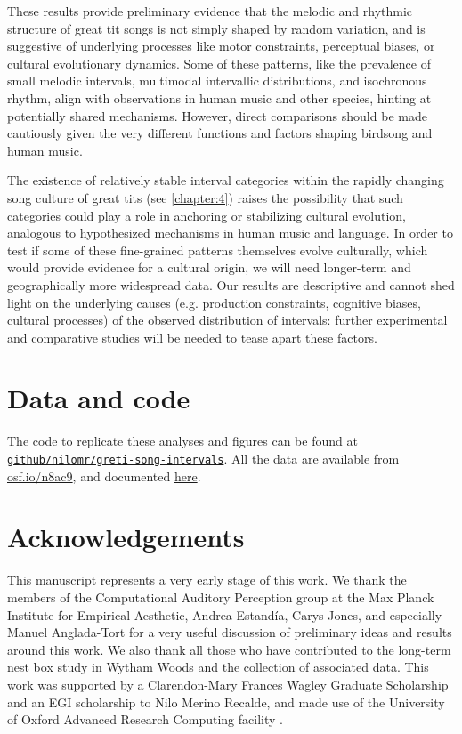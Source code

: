 These results provide preliminary evidence that the melodic and rhythmic structure of great tit songs is not simply shaped by random variation, and is suggestive of underlying processes like motor constraints, perceptual biases, or cultural evolutionary dynamics. Some of these patterns, like the prevalence of small melodic intervals, multimodal intervallic distributions, and isochronous rhythm, align with observations in human music and other species, hinting at potentially shared mechanisms. However, direct comparisons should be made cautiously given the very different functions and factors shaping birdsong and human music.

The existence of relatively stable interval categories within the rapidly changing song culture of great tits (see \autoref{chapter:4}) raises the possibility that such categories could play a role in anchoring or stabilizing cultural evolution, analogous to hypothesized mechanisms in human music and language. In order to test if some of these fine-grained patterns themselves evolve culturally, which would provide evidence for a cultural origin, we will need longer-term and geographically more widespread data. Our results are descriptive and cannot shed light on the underlying causes (e.g. production constraints, cognitive biases, cultural processes) of the observed distribution of intervals: further experimental and comparative studies will be needed to tease apart these factors.

\section{Data and code}

The code to replicate these analyses and figures can be found at \href{https://github.com/nilomr/greti-song-intervals}{\nolinkurl{github/nilomr/greti-song-intervals}}. All the data are available from \href{https://osf.io/n8ac9}{osf.io/n8ac9}, and documented \href{https://nilomr.github.io/great-tit-hits/}{here}.

\section{Acknowledgements}
This manuscript represents a very early stage of this work. We thank the members of the Computational Auditory Perception group at the Max Planck Institute for Empirical Aesthetic, Andrea Estandía, Carys Jones, and especially Manuel Anglada-Tort for a very useful discussion of preliminary ideas and results around this work. We also thank all those who have contributed to the long-term nest box study in Wytham Woods and the collection of associated data. This work was supported by a Clarendon-Mary Frances Wagley Graduate Scholarship and an EGI scholarship to Nilo Merino Recalde, and made use of the University of Oxford Advanced Research Computing facility \parencite{richards2015}.

